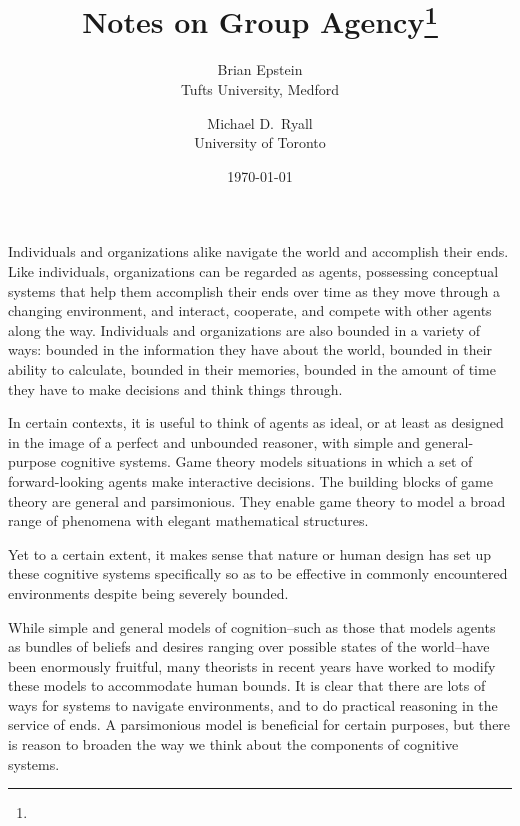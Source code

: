 \documentclass[
11pt,
titlepage,
reqno,
]{article}%
\theoremstyle{definition}
\begin{document}
	
	\title{Notes on Group Agency\thanks{}
	}
	\author
	{
		Brian Epstein \\Tufts University, Medford
		\and 
		Michael D.\ Ryall \\University of Toronto 
	}
	\date{\today}
	\maketitle
	
	
	
\def\baselinestretch{1.5}\small\normalsize
\newcommand{\ra}[1]{\renewcommand{\arraystretch}{#1}}%
\newpage
	
	
Individuals and organizations alike navigate the world and accomplish their ends. 
Like individuals, organizations can be regarded as agents, possessing conceptual systems that help them accomplish their ends over time as they move through a changing environment, and interact, cooperate, and compete with other agents along the way. 
Individuals and organizations are also bounded in a variety of ways: bounded in the information they have about the world, bounded in their ability to calculate, bounded in their memories, bounded in the amount of time they have to make decisions and think things through.
	
In certain contexts, it is useful to think of agents as ideal, or at least as designed in the image of a perfect and unbounded reasoner, with simple and general-purpose cognitive systems. 
Game theory models situations in which a set of forward-looking agents make interactive decisions. The building blocks of game theory are general and parsimonious. They enable game theory to model a broad range of phenomena with elegant mathematical structures. 

Yet to a certain extent, it makes sense that nature or human design has set up these cognitive systems specifically so as to be effective in commonly encountered environments despite being severely bounded.

While simple and general models of cognition--such as those that models agents as bundles of beliefs and desires ranging over possible states of the world--have been enormously fruitful, many theorists in recent years have worked to modify these models to accommodate human bounds. It is clear that there are lots of ways for systems to navigate environments, and to do practical reasoning in the service of ends. A parsimonious model is beneficial for certain purposes, but there is reason to broaden the way we think about the components of cognitive systems.
\end{document}
